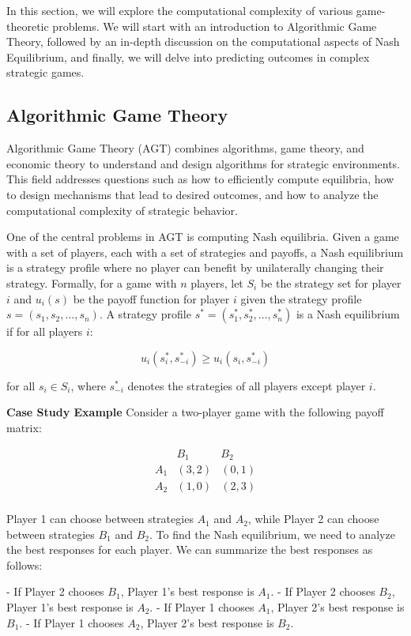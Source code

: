 \documentclass[12pt]{book} %
\begin{document}
In this section, we will explore the computational complexity of various game-theoretic problems. We will start with an introduction to Algorithmic Game Theory, followed by an in-depth discussion on the computational aspects of Nash Equilibrium, and finally, we will delve into predicting outcomes in complex strategic games.

\subsection{Algorithmic Game Theory}
Algorithmic Game Theory (AGT) combines algorithms, game theory, and economic theory to understand and design algorithms for strategic environments. This field addresses questions such as how to efficiently compute equilibria, how to design mechanisms that lead to desired outcomes, and how to analyze the computational complexity of strategic behavior.

One of the central problems in AGT is computing Nash equilibria. Given a game with a set of players, each with a set of strategies and payoffs, a Nash equilibrium is a strategy profile where no player can benefit by unilaterally changing their strategy. Formally, for a game with $n$ players, let $S_i$ be the strategy set for player $i$ and $u_i(s)$ be the payoff function for player $i$ given the strategy profile $s = (s_1, s_2, \ldots, s_n)$. A strategy profile $s^* = (s_1^*, s_2^*, \ldots, s_n^*)$ is a Nash equilibrium if for all players $i$:

\[
u_i(s_i^*, s_{-i}^*) \geq u_i(s_i, s_{-i}^*)
\]

for all $s_i \in S_i$, where $s_{-i}^*$ denotes the strategies of all players except player $i$.

\textbf{Case Study Example}
Consider a two-player game with the following payoff matrix:

\[
\begin{array}{c|cc}
 & B_1 & B_2 \\
\hline
A_1 & (3, 2) & (0, 1) \\
A_2 & (1, 0) & (2, 3) \\
\end{array}
\]

Player 1 can choose between strategies $A_1$ and $A_2$, while Player 2 can choose between strategies $B_1$ and $B_2$. To find the Nash equilibrium, we need to analyze the best responses for each player. We can summarize the best responses as follows:

- If Player 2 chooses $B_1$, Player 1's best response is $A_1$.
- If Player 2 chooses $B_2$, Player 1's best response is $A_2$.
- If Player 1 chooses $A_1$, Player 2's best response is $B_1$.
- If Player 1 chooses $A_2$, Player 2's best response is $B_2$.
\end{document}
